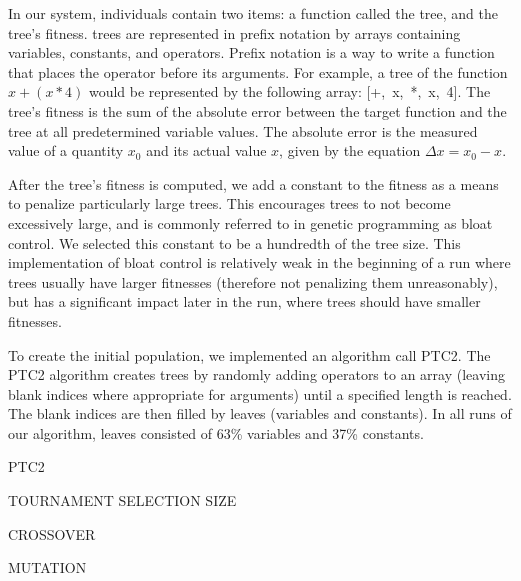 \documentclass[12pt]{article}
\begin{document}
In our system, individuals contain two items: a function called the tree, and the tree's fitness. trees are represented in prefix notation by arrays containing variables, constants, and operators. Prefix notation is a way to write  a function that places the operator before its arguments. For example, a tree of the function $x + (x * 4)$ would be represented by the following array: [+,~x,~*,~x,~4]. The tree's fitness is the sum of the absolute error between the target function and the tree at all predetermined variable values. The absolute error is  the measured value of a quantity $x_{0}$ and its actual value $x$, given by the equation $\Delta x=x_{0}-x$. 

After the tree's fitness is computed, we add a constant to the fitness as a means to penalize particularly large trees. This encourages trees to not become excessively large, and is commonly referred to in genetic programming as bloat control. We selected this constant to be a hundredth of the tree size. This implementation of bloat control is relatively weak in the beginning of a run where trees usually have larger fitnesses (therefore not penalizing them unreasonably), but has a significant impact later in the run, where trees should have smaller fitnesses.

To create the initial population, we implemented an algorithm call PTC2. The PTC2 algorithm creates trees by randomly adding operators to an array (leaving blank indices where appropriate for arguments) until a specified length is reached. The blank indices are then filled by leaves (variables and constants). In all runs of our algorithm, leaves consisted of 63\% variables and 37\% constants.

PTC2

TOURNAMENT SELECTION SIZE

CROSSOVER

MUTATION



  



\end{document}
